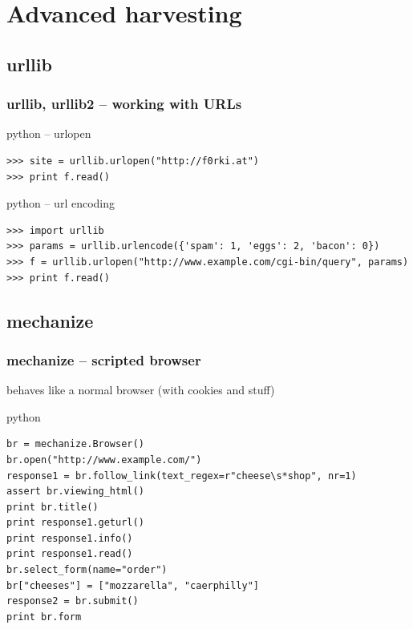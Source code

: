 \documentclass{beamer}
\begin{document}
\section{Advanced harvesting}


\subsection*{urllib}	%
\begin{frame}[fragile]
	\frametitle{urllib, urllib2 -- working with URLs}
	\begin{exampleblock}{python -- urlopen}
	\begin{lstlisting}
>>> site = urllib.urlopen("http://f0rki.at")
>>> print f.read()
	\end{lstlisting}
	\end{exampleblock}

\pause

	\begin{exampleblock}{python -- url encoding}
	\begin{lstlisting}
>>> import urllib
>>> params = urllib.urlencode({'spam': 1, 'eggs': 2, 'bacon': 0})
>>> f = urllib.urlopen("http://www.example.com/cgi-bin/query", params)
>>> print f.read()
	\end{lstlisting}
	\end{exampleblock}
\end{frame}

\subsection*{mechanize} %
\begin{frame}[fragile]
	\frametitle{mechanize -- scripted browser}
	behaves like a normal browser (with cookies and stuff)
	\begin{exampleblock}{python}
	\begin{lstlisting}
br = mechanize.Browser()
br.open("http://www.example.com/")
response1 = br.follow_link(text_regex=r"cheese\s*shop", nr=1)
assert br.viewing_html()
print br.title()
print response1.geturl()
print response1.info()
print response1.read()
br.select_form(name="order")
br["cheeses"] = ["mozzarella", "caerphilly"]
response2 = br.submit()
print br.form
	\end{lstlisting}
	\end{exampleblock}
\end{frame}
\end{document}
